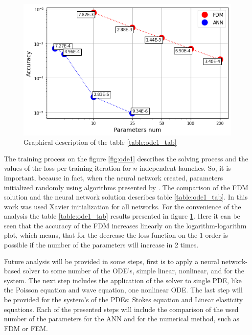 \begin{figure}[h]
	\centering
	\includegraphics[width=\textwidth]{images/chapter2/fdm_ann_ode_1.png}
	\caption{Graphical description of the table \ref{table:ode1_tab}}
	\label{fig:fdm_ann_ode1}
\end{figure}

The training process on the figure \ref{fig:ode1} describes the solving process and the values of the loss per training iteration for $n$ independent launches. So, it is important, because in fact, when the neural network created, parameters initialized randomly using algorithms presented by \cite{glorot2010understanding} \cite{he2015delving} \cite{saxe2013exact}. 
The comparison of the FDM solution and the neural network solution describes table \ref{table:ode1_tab}. In this work was used Xavier initialization for all networks. For the convenience of the analysis the table \ref{table:ode1_tab} results presented in figure \ref{fig:fdm_ann_ode1}. Here it can be seen that the accuracy of the FDM increases linearly on the logarithm-logarithm plot, which means, that for the decrease the loss function on the 1 order is possible if the number of the parameters will increase in 2 times.

Future analysis will be provided in some steps, first is to apply a neural network-based solver to some number of the ODE's, simple linear, nonlinear, and for the system. The next step includes the application of the solver to single PDE, like the Poisson equation and wave equation, one nonlinear ODE. The last step will be provided for the system's of the PDEs: Stokes equation and Linear elasticity equations. Each of the presented steps will include the comparison of the used number of the parameters for the ANN and for the numerical method, such as FDM or FEM.

